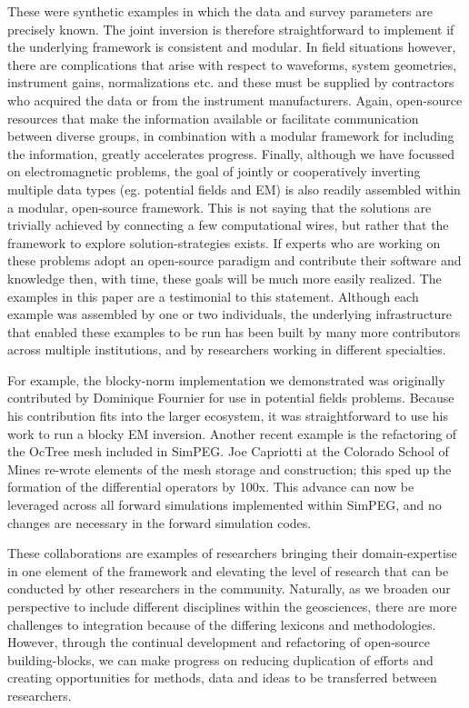 \documentclass[paper]{geophysics}
\begin{document}
These were synthetic examples in which the data and survey parameters are precisely known. The joint inversion is therefore straightforward to implement if the underlying framework is consistent and modular. In field situations however, there are complications that arise with respect to waveforms, system geometries, instrument gains, normalizations etc. and these must be supplied by contractors who acquired the data or from the instrument manufacturers. Again, open-source resources that make the information available or facilitate communication between diverse groups, in combination with a modular framework for including the information, greatly accelerates progress. Finally, although we have focussed on electromagnetic problems, the goal of jointly or cooperatively inverting multiple data types (eg. potential fields and EM) is also readily assembled within a modular, open-source framework. This is not saying that the solutions are trivially achieved by connecting a few computational wires, but rather that the framework to explore solution-strategies exists. If experts who are working on these problems adopt an open-source paradigm and contribute their software and knowledge then, with time, these goals will be much more easily realized. The examples in this paper are a testimonial to this statement. Although each example was assembled by one or two individuals, the underlying infrastructure that enabled these examples to be run has been built by many more contributors across multiple institutions, and by researchers working in different specialties.

For example, the blocky-norm implementation we demonstrated was originally contributed by Dominique Fournier for use in potential fields problems. Because his contribution fits into the larger ecosystem, it was straightforward to use his work to run a blocky EM inversion. Another recent example is the refactoring of the OcTree mesh included in SimPEG. Joe Capriotti at the Colorado School of Mines re-wrote elements of the mesh storage and construction; this sped up the formation of the differential operators by 100x. This advance can now be leveraged across all forward simulations implemented within SimPEG, and no changes are necessary in the forward simulation codes.

These collaborations are examples of researchers bringing their domain-expertise in one element of the framework and elevating the level of research that can be conducted by other researchers in the community. Naturally, as we broaden our perspective to include different disciplines within the geosciences,  there are more challenges to integration because of the differing lexicons and methodologies. However, through the continual development and refactoring of open-source building-blocks, we can make progress on reducing duplication of efforts and creating opportunities for methods, data and ideas to be transferred between researchers.
\end{document}
